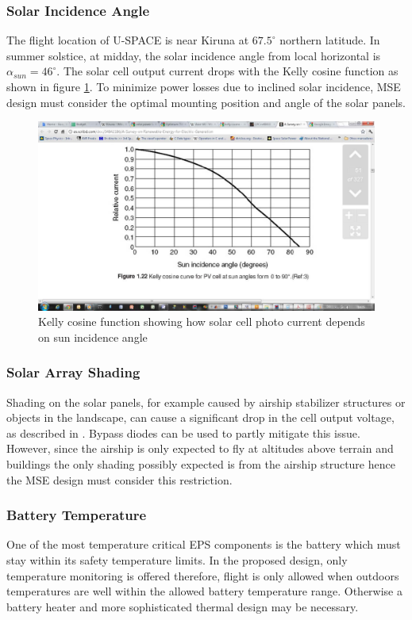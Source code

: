 \subsubsection*{Solar Incidence Angle}
The flight location of U-SPACE is near Kiruna at $67.5^{\circ}$ northern latitude. In summer solstice, at midday, the solar incidence angle from local horizontal is $\alpha_{sun}=46^{\circ}$\cite[eq. 1]{PDR}. The solar cell output current drops with the Kelly cosine function as shown in figure \ref{fig:KellyCosine}. To minimize power losses due to inclined solar incidence, \ac{MSE} design must consider the optimal mounting position and angle of the solar panels.
%
\begin{figure}[H]
\centering
\includegraphics[scale=0.4]{figures/fig_KellyCosine}
\caption{Kelly cosine function showing how solar cell photo current depends on sun incidence angle}
\label{fig:KellyCosine}
\end{figure}
%
\subsubsection*{Solar Array Shading}
Shading on the solar panels, for example caused by airship stabilizer structures or objects in the landscape, can cause a significant drop in the cell output voltage, as described in \cite[p. 165]{Mukund}. Bypass diodes can be used to partly mitigate this issue. However, since the airship is only expected to fly at altitudes above terrain and buildings the only shading possibly expected is from the airship structure hence the \ac{MSE} design must consider this restriction.
%
\subsubsection*{Battery Temperature}
One of the most temperature critical \ac{EPS} components is the battery which must stay within its safety temperature limits. In the proposed design, only temperature monitoring is offered therefore, flight is only allowed when outdoors temperatures are well within the allowed battery temperature range. Otherwise a battery heater and more sophisticated thermal design may be necessary.
%
